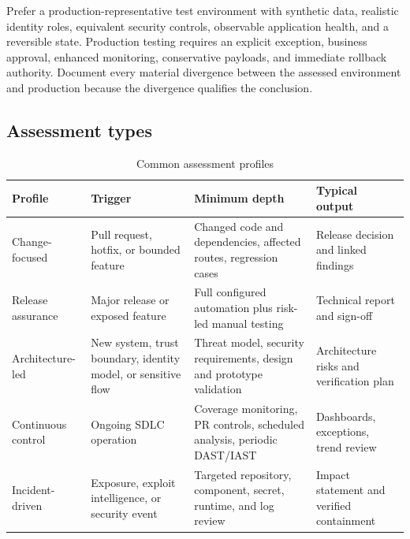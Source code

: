 \documentclass[11pt,letterpaper]{article}
\begin{document}
Prefer a production-representative test environment with synthetic data, realistic identity roles, equivalent security controls, observable application health, and a reversible state. Production testing requires an explicit exception, business approval, enhanced monitoring, conservative payloads, and immediate rollback authority. Document every material divergence between the assessed environment and production because the divergence qualifies the conclusion.

\subsection{Assessment types}

\begin{table}[H]
\centering
\caption{Common assessment profiles}
\small
\begin{tabularx}{\textwidth}{@{}L{1.35in}Y Y Y@{}}
\toprule
\textbf{Profile} & \textbf{Trigger} & \textbf{Minimum depth} & \textbf{Typical output} \\
\midrule
Change-focused & Pull request, hotfix, or bounded feature & Changed code and dependencies, affected routes, regression cases & Release decision and linked findings \\
Release assurance & Major release or exposed feature & Full configured automation plus risk-led manual testing & Technical report and sign-off \\
Architecture-led & New system, trust boundary, identity model, or sensitive flow & Threat model, security requirements, design and prototype validation & Architecture risks and verification plan \\
Continuous control & Ongoing SDLC operation & Coverage monitoring, PR controls, scheduled analysis, periodic DAST/IAST & Dashboards, exceptions, trend review \\
Incident-driven & Exposure, exploit intelligence, or security event & Targeted repository, component, secret, runtime, and log review & Impact statement and verified containment \\
\bottomrule
\end{tabularx}
\end{table}
\end{document}
